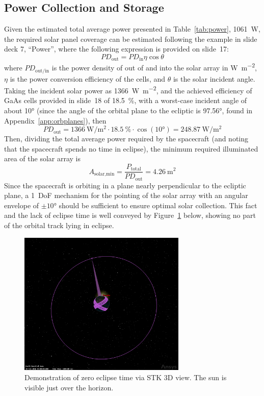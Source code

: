 \documentclass[9pt]{article}
\begin{document}
\subsection{Power Collection and Storage}\label{app:powercollection}
Given the estimated total average power presented in Table~\ref{tab:power}, \qty{1061}{\watt}, the required solar panel coverage can be estimated following the example in slide deck 7, ``Power'', where the following expression is provided on slide~17:
\begin{equation}
  {PD}_\text{out}={PD}_\text{in}\eta\cos\theta
\end{equation}
where ${PD}_\text{out/in}$ is the power density of out of and into the solar array in \si{\watt\per\meter\squared}, $\eta$ is the power conversion efficiency of the cells, and $\theta$ is the solar incident angle.
Taking the incident solar power as \qty{1366}{\watt\per\meter\squared}, and the achieved efficiency of GaAs cells provided in slide~18 of \qty{18.5}{\percent}, with a worst-case incident angle of about \ang{10} (since the angle of the orbital plane to the ecliptic is \ang{97.56}, found in Appendix~\ref{app:orbplanes}), then
\begin{equation}
  {PD}_\text{out}=\qty{1366}{\watt\per\meter\squared}\cdot\qty{18.5}{\percent}\cdot\cos(\ang{10})= \qty{248.87}{\watt\per\meter\squared}
\end{equation}
Then, dividing the total average power required by the spacecraft (and noting that the spacecraft spends no time in eclipse), the minimum required illuminated area of the solar array is
\begin{equation}
  A_\text{solar,min} = \frac{P_\text{total}}{PD_\text{out}} = \qty{4.26}{\square\meter}
\end{equation}
Since the spacecraft is orbiting in a plane nearly perpendicular to the ecliptic plane, a 1~DoF mechanism for the pointing of the solar array with an angular envelope of $\pm\ang{10}$ should be sufficient to ensure optimal solar collection.
This fact and the lack of eclipse time is well conveyed by Figure~\ref{fig:eclipse} below, showing no part of the orbital track lying in eclipse.

\begin{figure}[h]
  \centering
  \captionsetup{width=.75\linewidth,font=small,labelfont=bf}
  \includegraphics[width=8cm]{zeroeclipse}
  \caption{Demonstration of zero eclipse time via STK 3D view. The sun is visible just over the horizon.}
  \label{fig:eclipse}
\end{figure}
\end{document}

